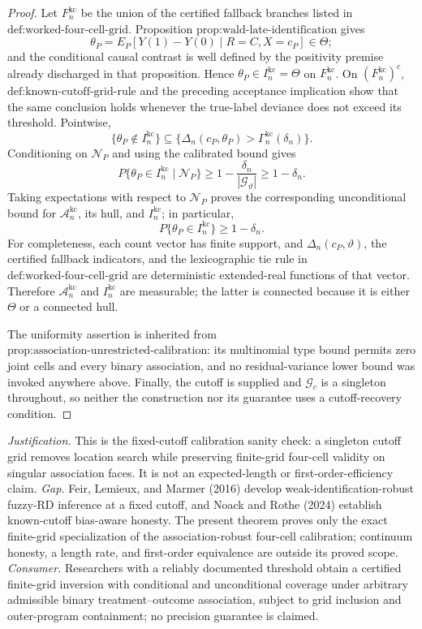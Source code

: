 \documentclass{article}
\begin{document}
\begin{proof}
Let \(F_n^{\mathrm{kc}}\) be the union of the certified fallback branches listed in \(\text{def:worked-four-cell-grid}\).  Proposition \(\text{prop:wald-late-identification}\) gives
\[
\theta_P=E_P\!\left[Y(1)-Y(0)\mid R=C,X=c_P\right]\in\Theta;
\]
and the conditional causal contrast is well defined by the positivity premise already discharged in that proposition.  Hence \(\theta_P\in I_n^{\mathrm{kc}}=\Theta\) on \(F_n^{\mathrm{kc}}\).  On \((F_n^{\mathrm{kc}})^c\), \(\text{def:known-cutoff-grid-rule}\) and the preceding acceptance implication show that the same conclusion holds whenever the true-label deviance does not exceed its threshold.  Pointwise,
\[
\{\theta_P\notin I_n^{\mathrm{kc}}\}
\subseteq
\{\Delta_n(c_P,\theta_P)>\Gamma_n^{\mathrm{kc}}(\delta_n)\}.
\]
Conditioning on \(\mathscr N_P\) and using the calibrated bound gives
\[
P\{\theta_P\in I_n^{\mathrm{kc}}\mid\mathscr N_P\}
\ge1-\frac{\delta_n}{|\mathcal G_\vartheta|}
\ge1-\delta_n.
\]
Taking expectations with respect to \(\mathscr N_P\) proves the corresponding unconditional bound for \(\mathcal A_n^{\mathrm{kc}}\), its hull, and \(I_n^{\mathrm{kc}}\); in particular,
\[
P\{\theta_P\in I_n^{\mathrm{kc}}\}\ge1-\delta_n.
\]
For completeness, each count vector has finite support, and \(\Delta_n(c_P,\vartheta)\), the certified fallback indicators, and the lexicographic tie rule in \(\text{def:worked-four-cell-grid}\) are deterministic extended-real functions of that vector.  Therefore \(\mathcal A_n^{\mathrm{kc}}\) and \(I_n^{\mathrm{kc}}\) are measurable; the latter is connected because it is either \(\Theta\) or a connected hull.

The uniformity assertion is inherited from \(\text{prop:association-unrestricted-calibration}\): its multinomial type bound permits zero joint cells and every binary association, and no residual-variance lower bound was invoked anywhere above.  Finally, the cutoff is supplied and \(\mathcal G_c\) is a singleton throughout, so neither the construction nor its guarantee uses a cutoff-recovery condition.
\end{proof}
\par\smallskip\noindent \textit{Justification.} This is the fixed-cutoff calibration sanity check: a singleton cutoff grid removes location search while preserving finite-grid four-cell validity on singular association faces. It is not an expected-length or first-order-efficiency claim. \textit{Gap.} Feir, Lemieux, and Marmer (2016) develop weak-identification-robust fuzzy-RD inference at a fixed cutoff, and Noack and Rothe (2024) establish known-cutoff bias-aware honesty. The present theorem proves only the exact finite-grid specialization of the association-robust four-cell calibration; continuum honesty, a length rate, and first-order equivalence are outside its proved scope. \textit{Consumer.} Researchers with a reliably documented threshold obtain a certified finite-grid inversion with conditional and unconditional coverage under arbitrary admissible binary treatment--outcome association, subject to grid inclusion and outer-program containment; no precision guarantee is claimed.
\end{document}
